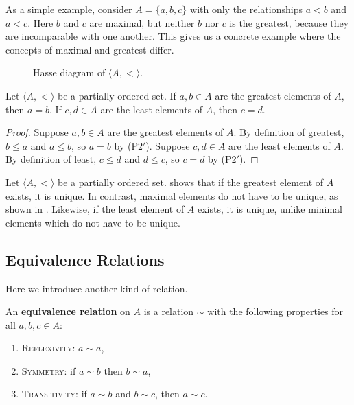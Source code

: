 \begin{example}\label{ch1ex_maximalelems}
	As a simple example, consider $A = \{a, b, c\}$ with only the relationships $a < b$ and $a < c$. 
	Here $b$ and $c$ are maximal, but neither $b$ nor $c$ is the greatest, because they are incomparable with one another. 
	This gives us a concrete example where the concepts of maximal and greatest differ. 
	\begin{figure}[H]
		\centering
		\caption{Hasse diagram of $\langle A, <\rangle$.}
	\end{figure}
\end{example}

\begin{prop}\label{ch1thm_greatest_least_unique}
	Let $\langle A, <\rangle$ be a partially ordered set. 
	If $a, b\in A$ are the greatest elements of $A$, then $a = b$. 
	If $c, d\in A$ are the least elements of $A$, then $c = d$. 
\end{prop}
\begin{proof}
	Suppose $a, b\in A$ are the greatest elements of $A$. 
	By definition of greatest, $b\le a$ and $a\le b$, so $a = b$ by (P2$'$). 
	Suppose $c, d\in A$ are the least elements of $A$. 
	By definition of least, $c\le d$ and $d\le c$, so $c = d$ by (P2$'$). 
\end{proof}

Let $\langle A, <\rangle$ be a partially ordered set. 
 shows that if the greatest element of $A$ exists, it is unique.
In contrast, maximal elements do not have to be unique, as shown in .
Likewise, if the least element of $A$ exists, it is unique, unlike minimal elements which do not have to be unique. 

\subsection{Equivalence Relations}

Here we introduce another kind of relation.

\begin{definition}
	An \textbf{equivalence relation} on $A$ is a relation $\sim$ with the following properties for all $a, b, c\in A$:
	\begin{enumerate}[itemsep=-0.4ex, label=(E\arabic*)]
		\item \textsc{Reflexivity:} $a\sim a$,
		\item \textsc{Symmetry:} if $a\sim b$ then $b\sim a$,
		\item \textsc{Transitivity:} if $a\sim b$ and $b\sim c$, then $a\sim c$.
	\end{enumerate}
\end{definition}

